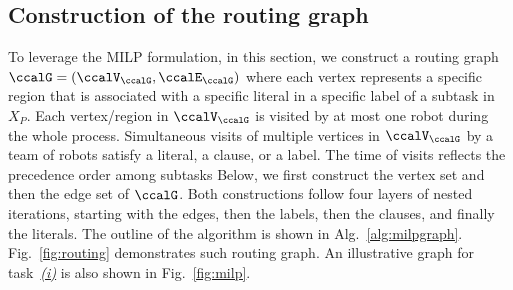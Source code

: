 \documentclass[Afour,sageh,times]{sagej}
\begin{document}
\subsection{Construction of the routing graph}\label{sec:graph}
To leverage the MILP formulation, in this section, we construct a routing graph $\ccalG = (\ccalV_{\ccalG},\ccalE_{\ccalG})$ where each vertex represents a specific region that is associated with a specific literal in a specific label of a subtask in $X_P$. Each vertex/region in $\ccalV_\ccalG$ is visited by at most one robot during the whole process. Simultaneous visits of multiple vertices in $\ccalV_\ccalG$ by a team of robots  satisfy a literal, a clause, or a label. The time of visits reflects the precedence order among subtasks  Below, we first construct  the vertex set and then the edge set of $\ccalG$. Both constructions follow four layers of nested iterations, starting with the edges, then the labels, then the clauses, and finally the literals. The outline of the algorithm is shown in Alg.~\ref{alg:milpgraph}.  Fig.~\ref{fig:routing} demonstrates such routing graph. An illustrative graph for task~\hyperref[task:i]{\it (i)}  is also shown in Fig.~\ref{fig:milp}.
\end{document}
